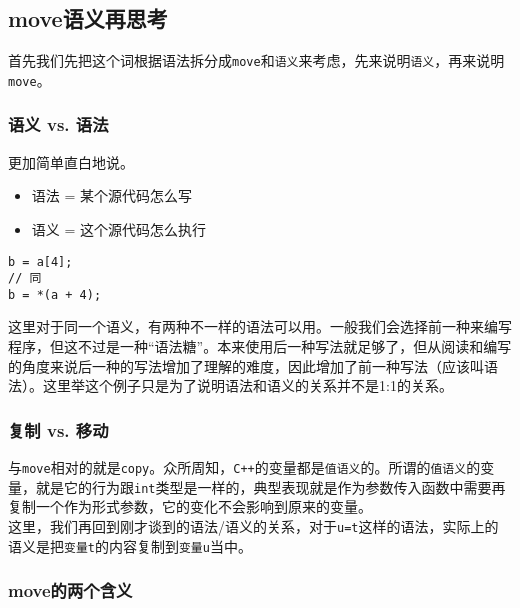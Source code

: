 \subsection[move语义再思考]{\texorpdfstring{\protect\hypertarget{1move_8}{}{}move语义再思考}{move语义再思考}}\label{moveux8bedux4e49ux518dux601dux8003}

首先我们先把这个词根据语法拆分成\texttt{move}和\texttt{语义}来考虑，先来说明\texttt{语义}，再来说明\texttt{move}。

\subsubsection[语义 vs.
语法]{\texorpdfstring{\protect\hypertarget{11_vs__11}{}{}语义 vs.
语法}{1.1.语义 vs. 语法}}\label{ux8bedux4e49-vs.-ux8bedux6cd5}

更加简单直白地说。

\begin{itemize}

\item
  语法 = 某个源代码怎么写
\item
  语义 = 这个源代码怎么执行
\end{itemize}

\begin{lstlisting}
b = a[4];
// 同
b = *(a + 4);
\end{lstlisting}

这里对于同一个语义，有两种不一样的语法可以用。一般我们会选择前一种来编写程序，但这不过是一种``语法糖''。本来使用后一种写法就足够了，但从阅读和编写的角度来说后一种的写法增加了理解的难度，因此增加了前一种写法（应该叫语法）。这里举这个例子只是为了说明语法和语义的关系并不是1:1的关系。

\subsubsection[复制 vs.
移动]{\texorpdfstring{\protect\hypertarget{12_vs__24}{}{}复制 vs.
移动}{1.2.复制 vs. 移动}}\label{ux590dux5236-vs.-ux79fbux52a8}

与\texttt{move}相对的就是\texttt{copy}。众所周知，\texttt{C++}的变量都是\texttt{值语义}的。所谓的\texttt{值语义}的变量，就是它的行为跟\texttt{int}类型是一样的，典型表现就是作为参数传入函数中需要再复制一个作为形式参数，它的变化不会影响到原来的变量。\\
这里，我们再回到刚才谈到的语法/语义的关系，对于\texttt{u=t}这样的语法，实际上的语义是把\texttt{变量t}的内容复制到\texttt{变量u}当中。

\subsubsection[move的两个含义]{\texorpdfstring{\protect\hypertarget{13move_28}{}{}move的两个含义}{1.3.move的两个含义}}\label{moveux7684ux4e24ux4e2aux542bux4e49}

